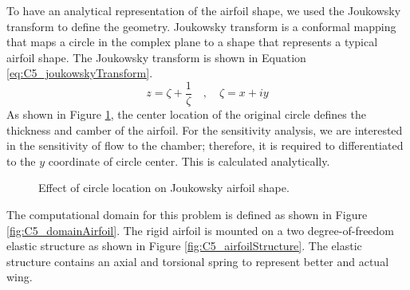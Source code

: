 To have an analytical representation of the airfoil shape, we used the Joukowsky transform to define the geometry. Joukowsky transform is a conformal mapping that maps a circle in the complex plane to a shape that represents a typical airfoil shape. The Joukowsky transform is shown in Equation \eqref{eq:C5_joukowskyTransform}.
%
\begin{equation}\label{eq:C5_joukowskyTransform}
	z = \zeta + \frac{1}{\zeta} \quad , \quad \zeta = x + iy
\end{equation}
%
As shown in Figure \ref{fig:C5_joukowskyAirfoil}, the center location of the original circle defines the thickness and camber of the airfoil. For the sensitivity analysis, we are interested in the sensitivity of flow to the chamber; therefore, it is required to differentiated to the $y$ coordinate of circle center. This is calculated analytically.
%
\begin{figure}[H]
    \centering
    \quad
    \quad
    \caption{Effect of circle location on Joukowsky airfoil shape.}
    \label{fig:C5_joukowskyAirfoil}
\end{figure}
%
The computational domain for this problem is defined as shown in Figure \ref{fig:C5_domainAirfoil}. The rigid airfoil is mounted on a two degree-of-freedom elastic structure as shown in Figure \ref{fig:C5_airfoilStructure}. The elastic structure contains an axial and torsional spring to represent better and actual wing.
